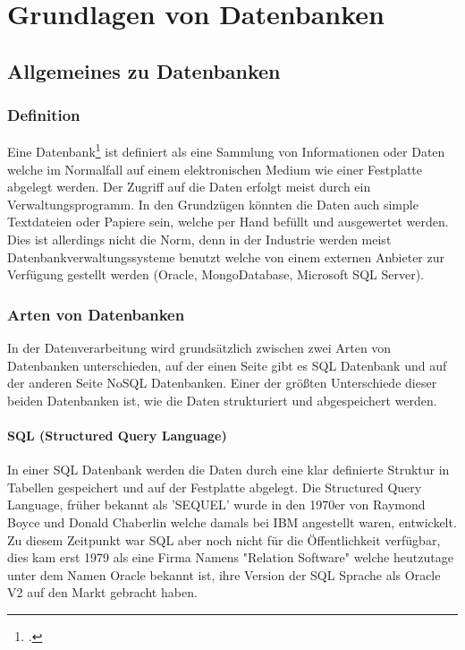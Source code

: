 \chapter{Grundlagen von Datenbanken}
\bauer
	\section{Allgemeines zu Datenbanken}
	\subsection{Definition}
	Eine Datenbank\footcite{oracle} ist definiert als eine Sammlung von Informationen oder Daten welche im Normalfall auf einem elektronischen Medium wie einer Festplatte abgelegt werden. 
	Der Zugriff auf die Daten erfolgt meist durch ein Verwaltungsprogramm. In den Grundzügen könnten die Daten auch simple Textdateien oder Papiere sein, welche per Hand befüllt und ausgewertet werden. 
	Dies ist allerdings nicht die Norm, denn in der Industrie werden meist Datenbankverwaltungssysteme benutzt welche von einem externen Anbieter zur Verfügung gestellt werden (Oracle, MongoDatabase, Microsoft SQL Server).	
	\subsection{Arten von Datenbanken}
	In der Datenverarbeitung wird grundsätzlich zwischen zwei Arten von Datenbanken unterschieden, auf der einen Seite gibt es SQL Datenbank und auf der anderen Seite NoSQL Datenbanken. 
	Einer der größten Unterschiede dieser beiden Datenbanken ist, wie die Daten strukturiert und abgespeichert werden.
	\subsubsection{SQL (Structured Query Language)} 
	In einer SQL Datenbank werden die Daten durch eine klar definierte Struktur in Tabellen gespeichert und auf der Festplatte abgelegt. 
	Die Structured Query Language, früher bekannt als 'SEQUEL' wurde in den 1970er von Raymond Boyce und Donald Chaberlin welche damals bei IBM angestellt waren, entwickelt. 
	Zu diesem Zeitpunkt war SQL aber noch nicht für die Öffentlichkeit verfügbar, dies kam erst 1979 als eine Firma Namens "Relation Software" welche heutzutage unter dem Namen Oracle bekannt ist, ihre Version der SQL Sprache als Oracle V2 auf den Markt gebracht haben.
